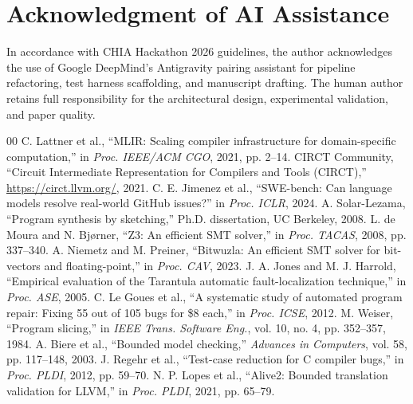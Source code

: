 \documentclass[conference]{IEEEtran}
\begin{document}
\section*{Acknowledgment of AI Assistance}
In accordance with CHIA Hackathon 2026 guidelines, the author acknowledges the use of Google DeepMind's Antigravity pairing assistant for pipeline refactoring, test harness scaffolding, and manuscript drafting. The human author retains full responsibility for the architectural design, experimental validation, and paper quality.

\begin{thebibliography}{00}
 C. Lattner et al., ``MLIR: Scaling compiler infrastructure for domain-specific computation,'' in \textit{Proc. IEEE/ACM CGO}, 2021, pp. 2--14.
 CIRCT Community, ``Circuit Intermediate Representation for Compilers and Tools (CIRCT),'' \url{https://circt.llvm.org/}, 2021.
 C. E. Jimenez et al., ``SWE-bench: Can language models resolve real-world GitHub issues?'' in \textit{Proc. ICLR}, 2024.
 A. Solar-Lezama, ``Program synthesis by sketching,'' Ph.D. dissertation, UC Berkeley, 2008.
 L. de Moura and N. Bj{\o}rner, ``Z3: An efficient SMT solver,'' in \textit{Proc. TACAS}, 2008, pp. 337--340.
 A. Niemetz and M. Preiner, ``Bitwuzla: An efficient SMT solver for bit-vectors and floating-point,'' in \textit{Proc. CAV}, 2023.
 J. A. Jones and M. J. Harrold, ``Empirical evaluation of the Tarantula automatic fault-localization technique,'' in \textit{Proc. ASE}, 2005.
 C. Le Goues et al., ``A systematic study of automated program repair: Fixing 55 out of 105 bugs for \$8 each,'' in \textit{Proc. ICSE}, 2012.
 M. Weiser, ``Program slicing,'' in \textit{IEEE Trans. Software Eng.}, vol. 10, no. 4, pp. 352--357, 1984.
 A. Biere et al., ``Bounded model checking,'' \textit{Advances in Computers}, vol. 58, pp. 117--148, 2003.
 J. Regehr et al., ``Test-case reduction for C compiler bugs,'' in \textit{Proc. PLDI}, 2012, pp. 59--70.
 N. P. Lopes et al., ``Alive2: Bounded translation validation for LLVM,'' in \textit{Proc. PLDI}, 2021, pp. 65--79.
\end{thebibliography}
\end{document}
